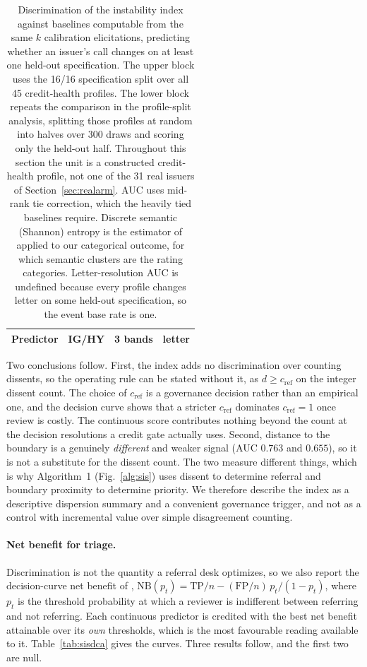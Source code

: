 \documentclass[a4paper,fleqn]{cas-sc}
\begin{document}
\begin{table}[t]\centering
\caption{Discrimination of the instability index against baselines computable from the same $k$
calibration elicitations, predicting whether an issuer's call changes on at least one held-out
specification. The upper block uses the 16/16 specification split over all 45 credit-health
profiles. The lower block repeats the comparison in the profile-split analysis, splitting those
profiles at random into halves over 300 draws and scoring only the held-out half. Throughout
this section the unit is a constructed credit-health profile, not one of the 31 real issuers of
Section~\ref{sec:realarm}. AUC uses mid-rank tie correction, which the
heavily tied baselines require. Discrete semantic (Shannon) entropy is the estimator of
\citet{farquhar2024semantic} applied to our categorical outcome, for which semantic clusters are
the rating categories. Letter-resolution AUC is undefined because every profile changes letter on
some held-out specification, so the event base rate is one.}
\label{tab:sisbase}
\begin{tabular}{lccc}\toprule
Predictor & IG/HY & 3 bands & letter \\\midrule%

\end{tabular}\end{table}

Two conclusions follow. First, the index adds no discrimination over counting dissents, so the
operating rule can be stated without it, as $d\ge c_{\mathrm{ref}}$ on the integer dissent count. The choice of $c_{\mathrm{ref}}$
is a governance decision rather than an empirical one, and the decision curve shows that a stricter $c_{\mathrm{ref}}$ dominates $c_{\mathrm{ref}}=1$ once review is costly.  The continuous score contributes
nothing beyond the count at the decision resolutions a credit gate actually uses. Second, distance
to the boundary is a genuinely \emph{different} and weaker signal (AUC $0.763$ and $0.655$), so it is
not a substitute for the dissent count. The two measure different things, which is why
Algorithm~1 (Fig.~\ref{alg:sis}) uses dissent to determine referral and boundary proximity to determine priority. We therefore describe the index as a descriptive
dispersion summary and a convenient governance trigger, and not as a control with incremental value over simple disagreement counting.

\paragraph{Net benefit for triage.}
Discrimination is not the quantity a referral desk optimizes, so we also report the decision-curve
net benefit of \citet{vickers2006dca},
$\mathrm{NB}(p_t)=\mathrm{TP}/n-(\mathrm{FP}/n)\,p_t/(1-p_t)$, where $p_t$ is the
threshold probability at which a reviewer is indifferent between referring and not referring. Each
continuous predictor is credited with the best net benefit attainable over its \emph{own}
thresholds, which is the most favourable reading available to it. Table~\ref{tab:sisdca} gives the
curves. Three results follow, and the first two are null.
\end{document}
